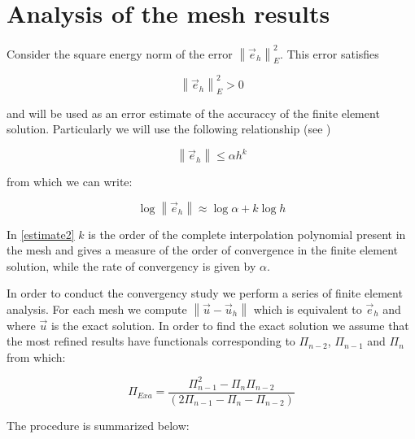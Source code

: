 \section{Analysis of the mesh results}

Consider the square energy norm of the error $\left\| {{{\vec e}_h}} \right\|_E^2$. This error satisfies

\[\left\| {{{\vec e}_h}} \right\|_E^2 > 0\]

and will be used as an error estimate of the accuraccy of the finite element solution. Particularly we will use the following relationship (see \cite{abaqus1989karlsson})

\begin{equation}
\left\| {{{\vec e}_h}} \right\| \le \alpha {h^k}
\label{estimate1}
\end{equation}


from which we can write:


\begin{equation}
\log \left\| {{{\vec e}_h}} \right\| \approx \log \alpha  + k\log h
\label{estimate2}
\end{equation}

In \cref{estimate2} $k$ is the order of the complete interpolation polynomial present in the mesh and gives a measure of the order of convergence in the finite element solution, while the rate of convergency is given by $\alpha$.

In order to conduct the convergency study we perform a series of finite element analysis. For each mesh we compute $\left\| {\vec u - {{\vec u}_h}} \right\|$ which is equivalent to $\vec e_h$ and where $\vec u$ is the exact solution. In order to find the exact solution we assume that the most refined results have functionals corresponding to ${\Pi _{n - 2}}$, ${\Pi _{n - 1}}$ and ${\Pi _{n}}$ from which:

\[{\Pi _{Exa}} = \frac{{\Pi _{n - 1}^2 - {\Pi _n}{\Pi _{n - 2}}}}{{(2{\Pi _{n - 1}} - {\Pi _n} - {\Pi _{n - 2}})}}\]

The procedure is summarized below:

